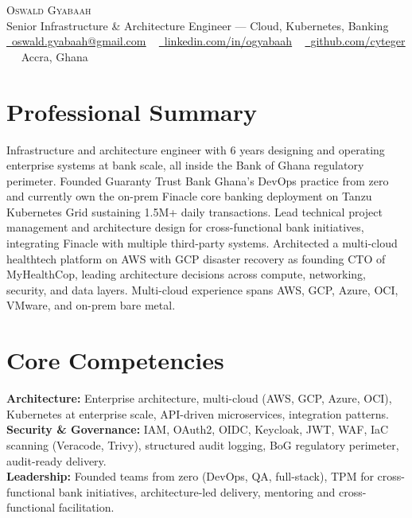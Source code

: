 \documentclass[letterpaper,11pt]{article}
\begin{document}
    \begin{center}
        {\Huge\scshape Oswald Gyabaah}
        \\ Senior Infrastructure \& Architecture Engineer --- Cloud, Kubernetes, Banking \\
        \small
        \href{mailto:oswald.gyabaah@gmail.com}{\raisebox{-0.2\height}\faEnvelope\  \underline{oswald.gyabaah@gmail.com}} ~
        \href{https://linkedin.com/in/ogyabaah}{\raisebox{-0.2\height}\faLinkedin\ \underline{linkedin.com/in/ogyabaah}}  ~
        \href{https://github.com/cyteger}{\raisebox{-0.2\height}\faGithub\ \underline{github.com/cyteger}} ~
        \raisebox{-0.2\height}\faMapMarker\ Accra, Ghana
    \end{center}

\section{Professional Summary}
\small
Infrastructure and architecture engineer with 6 years designing and operating enterprise systems at bank scale, all inside the Bank of Ghana regulatory perimeter. Founded Guaranty Trust Bank Ghana's DevOps practice from zero and currently own the on-prem Finacle core banking deployment on Tanzu Kubernetes Grid sustaining 1.5M+ daily transactions. Lead technical project management and architecture design for cross-functional bank initiatives, integrating Finacle with multiple third-party systems. Architected a multi-cloud healthtech platform on AWS with GCP disaster recovery as founding CTO of MyHealthCop, leading architecture decisions across compute, networking, security, and data layers. Multi-cloud experience spans AWS, GCP, Azure, OCI, VMware, and on-prem bare metal.

\vspace{4pt}

\section{Core Competencies}
\vspace{-7pt}
\begin{itemize}[leftmargin=0.15in, label={}]\small{\item{
\textbf{Architecture:} Enterprise architecture, multi-cloud (AWS, GCP, Azure, OCI), Kubernetes at enterprise scale, API-driven microservices, integration patterns. \\
\textbf{Security \& Governance:} IAM, OAuth2, OIDC, Keycloak, JWT, WAF, IaC scanning (Veracode, Trivy), structured audit logging, BoG regulatory perimeter, audit-ready delivery. \\
\textbf{Leadership:} Founded teams from zero (DevOps, QA, full-stack), TPM for cross-functional bank initiatives, architecture-led delivery, mentoring and cross-functional facilitation.
}}
\end{itemize}
\end{document}
